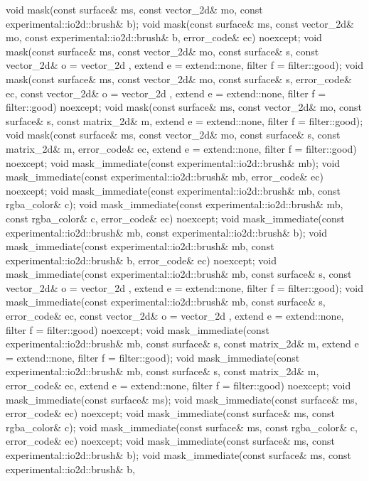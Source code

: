 \begin{codeblock}
{{{{{    void mask(const surface& ms, const vector_2d& mo,
      const experimental::io2d::brush& b);
    void mask(const surface& ms, const vector_2d& mo,
      const experimental::io2d::brush& b, error_code& ec) noexcept;
    void mask(const surface& ms, const vector_2d& mo, const surface& s,
      const vector_2d& o = vector_2d{ }, extend e = extend::none,
      filter f = filter::good);
    void mask(const surface& ms, const vector_2d& mo, const surface& s,
      error_code& ec, const vector_2d& o = vector_2d{ },
      extend e = extend::none, filter f = filter::good) noexcept;
    void mask(const surface& ms, const vector_2d& mo, const surface& s,
      const matrix_2d& m, extend e = extend::none, filter f = filter::good);
    void mask(const surface& ms, const vector_2d& mo, const surface& s,
      const matrix_2d& m, error_code& ec, extend e = extend::none,
      filter f = filter::good) noexcept;
    void mask_immediate(const experimental::io2d::brush& mb);
    void mask_immediate(const experimental::io2d::brush& mb, error_code& ec)
      noexcept;
    void mask_immediate(const experimental::io2d::brush& mb,
      const rgba_color& c);
    void mask_immediate(const experimental::io2d::brush& mb,
      const rgba_color& c, error_code& ec) noexcept;
    void mask_immediate(const experimental::io2d::brush& mb,
      const experimental::io2d::brush& b);
    void mask_immediate(const experimental::io2d::brush& mb,
      const experimental::io2d::brush& b, error_code& ec) noexcept;
    void mask_immediate(const experimental::io2d::brush& mb, const surface& s,
      const vector_2d& o = vector_2d{ }, extend e = extend::none,
      filter f = filter::good);
    void mask_immediate(const experimental::io2d::brush& mb, const surface& s,
      error_code& ec, const vector_2d& o = vector_2d{ },
      extend e = extend::none, filter f = filter::good) noexcept;
    void mask_immediate(const experimental::io2d::brush& mb, const surface& s, 
      const matrix_2d& m, extend e = extend::none, filter f = filter::good);
    void mask_immediate(const experimental::io2d::brush& mb, const surface& s,
      const matrix_2d& m, error_code& ec, extend e = extend::none,
      filter f = filter::good) noexcept;
    void mask_immediate(const surface& ms);
    void mask_immediate(const surface& ms, error_code& ec) noexcept;
    void mask_immediate(const surface& ms, const rgba_color& c);
    void mask_immediate(const surface& ms, const rgba_color& c, error_code& ec) 
      noexcept;
    void mask_immediate(const surface& ms, const experimental::io2d::brush& b);
    void mask_immediate(const surface& ms, const experimental::io2d::brush& b,
}}}}}
\end{codeblock}
